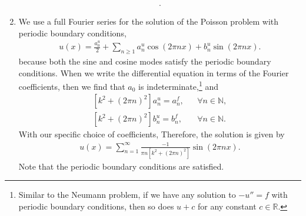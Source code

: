 \documentclass[11pt]{article}
\begin{document}
\begin{solution}
\begin{enumerate}
\begin{align*}
            .
        \end{align*}

        \item 
        We use a full Fourier series for the solution of the Poisson problem with periodic boundary conditions,
        \begin{align*}
            u(x) = \frac{a^{u}_0}{2} + \sum_{n \geq 1} a^{u}_{n} \cos( 2 \pi n x ) + b^{u}_{n} \sin( 2 \pi n x ).
        \end{align*}
        because both the sine and cosine modes satisfy the periodic boundary conditions. 
        When we write the differential equation in terms of the Fourier coefficients, then we find that $a_0$ is indeterminate,\footnote{Similar to the Neumann problem, if we have any solution to $-u'' = f$ with periodic boundary conditions, then so does $u+c$ for any constant $c \in \mathbb R$.} 
        and 
        \begin{align*}
            \left [k^2 + (2 \pi n)^2 \right] a^{u}_{n} = a^{f}_{n}, & & \forall n \in \mathbb{N}
            ,
            \\ 
            \left [k^2 + (2 \pi n)^2 \right] b^{u}_{n} = b^{f}_{n}, & & \forall n \in \mathbb{N}
            .
        \end{align*}
        With our specific choice of coefficients, 
        Therefore, the solution is given by
        \begin{align*}
            u(x) = \sum_{n=1}^{\infty} \frac{-1}{\pi n \left[k^2 + (2 \pi n)^2 \right]} \sin(2 \pi n x).
        \end{align*}
        Note that the periodic boundary conditions are satisfied.
    \end{enumerate}
\end{solution}
\end{document}
